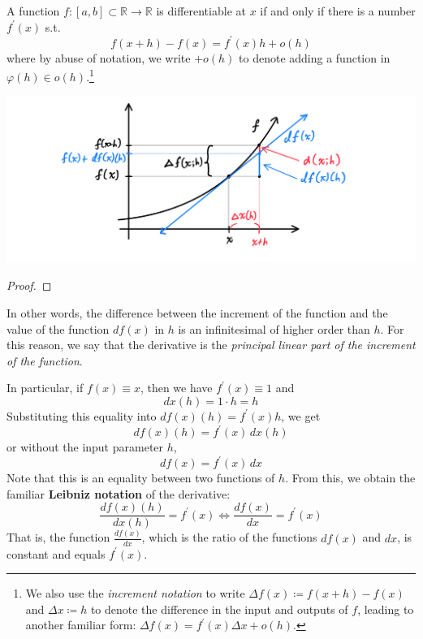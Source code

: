   \begin{theorem}
    A function $f: [a, b] \subset \mathbb{R} \to \mathbb{R}$ is differentiable at $x$ if and only if there is a number $f^\prime (x)$ s.t. 
    \begin{equation}
      f(x + h) - f(x) = f^\prime (x) h + o(h)
    \end{equation}
    where by abuse of notation, we write $+ o(h)$ to denote adding a function in $\varphi(h) \in o(h)$.\footnote{We also use the \textit{increment notation} to write $\Delta f(x) \coloneqq f(x + h) - f(x)$ and $\Delta x \coloneqq h$ to denote the difference in the input and outputs of $f$, leading to another familiar form: $\Delta f(x) = f^\prime (x) \Delta x + o(h)$.}

    \begin{center}
        \includegraphics[scale=0.25]{img/Differential_Diagram.PNG}
    \end{center}
  \end{theorem}
  \begin{proof}
    
  \end{proof}

  In other words, the difference between the increment of the function and the value of the function $df(x)$ in $h$ is an infinitesimal of higher order than $h$. For this reason, we say that the derivative is the \textit{principal linear part of the increment of the function}. 

  In particular, if $f(x) \equiv x$, then we have $f^\prime (x) \equiv 1$ and 
  \[dx (h) = 1 \cdot h = h\]
  Substituting this equality into $df(x) (h) = f^\prime (x) h$, we get
  \[df (x) (h) = f^\prime (x) \,dx (h)\]
  or without the input parameter $h$, 
  \[df(x) = f^\prime (x) \,dx\]
  Note that this is an equality between two functions of $h$. From this, we obtain the familiar \textbf{Leibniz notation} of the derivative: 
  \[\frac{df (x) (h)}{dx(h)} = f^\prime (x) \iff \frac{df(x)}{dx} = f^\prime (x)\]
  That is, the function $\frac{df(x)}{dx}$, which is the ratio of the functions $df(x)$ and $dx$, is constant and equals $f^\prime (x)$. 


